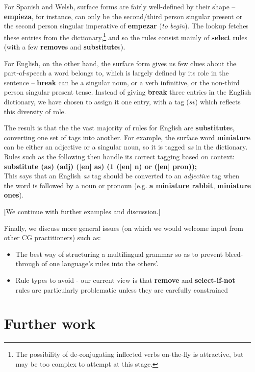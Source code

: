 \documentclass[11pt]{article}
\begin{document}
For Spanish and Welsh, surface forms are fairly well-defined by their shape -- \textbf{empieza}, for instance, can only be the second/third person singular present or the second person singular imperative of \textbf{empezar} (\textit{to begin}).  The lookup fetches these entries from the dictionary,\footnote{The possibility of de-conjugating inflected verbs on-the-fly is attractive, but may be too complex to attempt at this stage.} and so the rules consist mainly of \textbf{select} rules (with a few \textbf{remove}s and \textbf{substitute}s).

For English, on the other hand, the surface form gives us few clues about the part-of-speech a word belongs to, which is largely defined by its role in the sentence -- \textbf{break} can be a singular noun, or a verb infinitive, or the non-third person singular present tense.  Instead of giving \textbf{break} three entries in the English dictionary, we have chosen to assign it one entry, with a tag (\textit{sv}) which reflects this diversity of role.  

The result is that the the vast majority of rules for English are \textbf{substitute}s, converting one set of tags into another.  For example, the surface word \textbf{miniature} can be either an adjective or a singular noun, so it is tagged \textit{as} in the dictionary.  Rules such as the following then handle its correct tagging based on context:\\
\indent\textbf{substitute (as) (adj) ([en] as) (1 ([en] n) or ([en] pron));}\\
This says that an English \textit{as} tag should be converted to an \textit{adjective} tag when the word is followed by a noun or pronoun (e.g. \textbf{a miniature rabbit}, \textbf{miniature ones}).

[We continue with further examples and discussion.]

Finally, we discuss more general issues (on which we would welcome input from other CG practitioners) such as:
\begin{itemize}
\item The best way of structuring a multilingual grammar so as to prevent bleed-through of one language's rules into the others'.
\item Rule types to avoid - our current view is that \textbf{remove} and \textbf{select-if-not} rules are particularly problematic unless they are carefully constrained
\end{itemize}

\section{Further work}
\label{sec:further}
\end{document}
